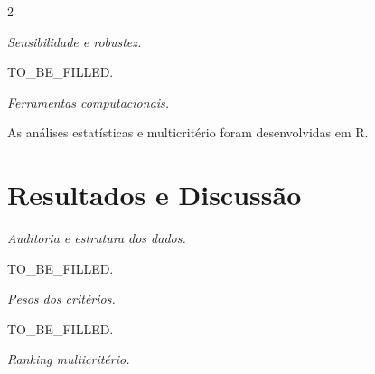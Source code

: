 \documentclass[10pt,a4paper]{article}
\begin{document}
\begin{multicols}{2}


\textit{Sensibilidade e robustez.}

TO\_BE\_FILLED.

%
%


\textit{Ferramentas computacionais.}

As análises estatísticas e multicritério foram desenvolvidas em R.

%
%
%



\section{Resultados e Discussão}

%
%
%
%


\textit{Auditoria e estrutura dos dados.}

TO\_BE\_FILLED.

%


\textit{Pesos dos critérios.}

TO\_BE\_FILLED.

%
%


\textit{Ranking multicritério.}


\end{multicols}
\end{document}
